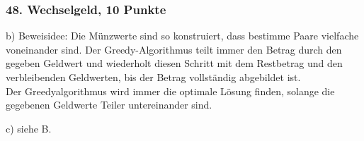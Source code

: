 \documentclass[ngerman,a4paper]{report}
\begin{document}
\subsubsection*{48. Wechselgeld, 10 Punkte}
\begin{compactitem}
\item[b)] Beweisidee: Die Münzwerte sind so konstruiert, dass bestimme Paare vielfache voneinander sind. Der Greedy-Algorithmus teilt immer den Betrag durch den gegeben Geldwert und wiederholt diesen Schritt mit dem Restbetrag und den verbleibenden Geldwerten, bis der Betrag vollständig abgebildet ist.\\ Der Greedyalgorithmus wird immer die optimale Lösung finden, solange die gegebenen Geldwerte Teiler untereinander sind.\\
\item[c)] siehe B. 
\end{compactitem}
\end{document}
